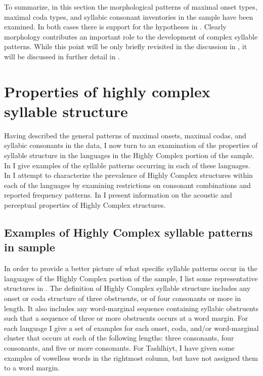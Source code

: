   To summarize, in this section the morphological patterns of maximal onset types, maximal coda types, and syllabic consonant inventories in the sample have been examined. In both cases there is support for the hypotheses in . Clearly morphology contributes an important role to the development of complex syllable patterns. While this point will be only briefly revisited in the discussion in , it will be discussed in further detail in .

\section{Properties of highly complex syllable structure}\label{sec:3.4}

  Having described the general patterns of maximal onsets, maximal codas, and syllabic consonants in the data, I now turn to an examination of the properties of syllable structure in the languages in the Highly Complex portion of the sample. In  I give examples of the syllable patterns occurring in each of these languages. In  I attempt to characterize the prevalence of Highly Complex structures within each of the languages by examining restrictions on consonant combinations and reported frequency patterns. In  I present information on the acoustic and perceptual properties of Highly Complex structures.

\subsection{Examples of Highly Complex syllable patterns in sample}\label{sec:3.4.1}

  In order to provide a better picture of what specific syllable patterns occur in the languages of the Highly Complex portion of the sample, I list some representative structures in . The definition of Highly Complex syllable structure includes any onset or coda structure of three obstruents, or of four consonants or more in length. It also includes any word-marginal sequence containing syllabic obstruents such that a sequence of three or more obstruents occurs at a word margin. For each language I give a set of examples for each onset, coda, and/or word-marginal cluster that occurs at each of the following lengths: three consonants, four consonants, and five or more consonants. For Tashlhiyt, I have given some examples of vowelless words in the rightmost column, but have not assigned them to a word margin.

